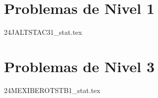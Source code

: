 \section{Problemas de Nivel 1}
{24JALTSTAC31_stat.tex} %

\section{Problemas de Nivel 3}
{24MEXIBEROTSTB1_stat.tex} %